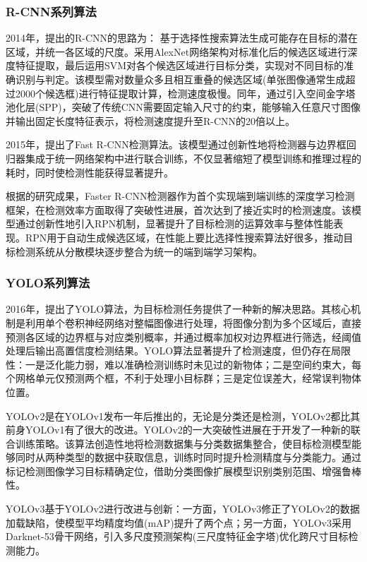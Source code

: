 \subsubsection{R-CNN系列算法}
2014年，\textcite{rcnn}提出的R-CNN的思路为：
基于选择性搜索算法\cite{selectSearch}生成可能存在目标的潜在区域，并统一各区域的尺度。采用AlexNet网络架构对标准化后的候选区域进行深度特征提取，最后运用SVM对各个候选区域进行目标分类，实现对不同目标的准确识别与判定。该模型需对数量众多且相互重叠的候选区域(单张图像通常生成超过2000个候选框)进行特征提取计算，检测速度极慢。同年，\textcite{sppnet}通过引入空间金字塔池化层(SPP)，突破了传统CNN需要固定输入尺寸的约束，能够输入任意尺寸图像并输出固定长度特征表示，将检测速度提升至R-CNN的20倍以上。

2015年，\textcite{fast-rcnn}提出了Fast R-CNN检测算法。该模型通过创新性地将检测器与边界框回归器集成于统一网络架构中进行联合训练，不仅显著缩短了模型训练和推理过程的耗时，同时使检测性能获得显著提升。

根据\textcite{faster-rcnn}的研究成果，Faster R-CNN检测器作为首个实现端到端训练的深度学习检测框架，在检测效率方面取得了突破性进展，首次达到了接近实时的检测速度。该模型通过创新性地引入RPN机制，显著提升了目标检测的运算效率与整体性能表现。RPN用于自动生成候选区域，在性能上要比选择性搜索算法好很多，推动目标检测系统从分散模块逐步整合为统一的端到端学习架构。

\subsubsection{YOLO系列算法}
2016年，\textcite{yolo}提出了YOLO算法，为目标检测任务提供了一种新的解决思路。其核心机制是利用单个卷积神经网络对整幅图像进行处理，将图像分割为多个区域后，直接预测各区域的边界框与对应类别概率，并通过概率加权对边界框进行筛选，经阈值处理后输出高置信度检测结果。YOLO算法显著提升了检测速度，但仍存在局限性：一是泛化能力弱，难以准确检测训练时未见过的新物体；二是空间约束大，每个网格单元仅预测两个框，不利于处理小目标群；三是定位误差大，经常误判物体位置。

YOLOv2是在YOLOv1发布一年后推出的\cite{yolov2}，无论是分类还是检测，YOLOv2都比其前身YOLOv1有了很大的改进。YOLOv2的一大突破性进展在于开发了一种新的联合训练策略。该算法创造性地将检测数据集与分类数据集整合，使目标检测模型能够同时从两种类型的数据中获取信息，训练时同时提升检测精度与分类能力。通过标记检测图像学习目标精确定位，借助分类图像扩展模型识别类别范围、增强鲁棒性。



YOLOv3\cite{yolov3}基于YOLOv2进行改进与创新：一方面，YOLOv3修正了YOLOv2的数据加载缺陷，使模型平均精度均值(mAP)提升了两个点；另一方面，YOLOv3采用Darknet-53骨干网络，引入多尺度预测架构(三尺度特征金字塔)优化跨尺寸目标检测能力。

